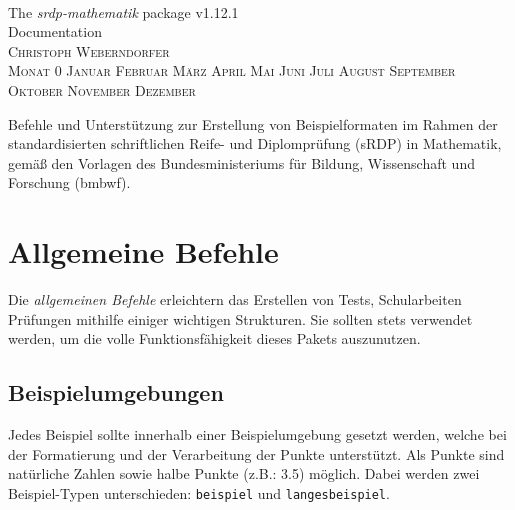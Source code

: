 \documentclass[a4paper,12pt]{article}
\makeatletter
\renewcommand*\tableofcontents{\@starttoc{toc}}
\newcommand{\Monat}{%
\ifcase\month
 Monat 0 \or Januar \or Februar \or März  \or April \or Mai \or Juni \or Juli%
 \or August \or September \or Oktober \or November \or Dezember
\fi}
\makeatother
\begin{document}
\begin{titlepage}
\thispagestyle{empty}
\begin{center}
~

\vfill

\Huge The \textit{srdp-mathematik} package v1.12.1\\[1cm]

Documentation \\ [1cm]

\flushright
\textsc{\large Christoph Weberndorfer} \\[-0.5cm]
\textsc{\large \Monat~\the\year} \\ 
\vspace{\baselineskip}

\vfill

\centering
\normalsize 
Befehle und Unterstützung zur Erstellung von Beispielformaten im Rahmen der standardisierten schriftlichen Reife- und Diplomprüfung (sRDP) in Mathematik, gemäß den Vorlagen des Bundesministeriums für Bildung, Wissenschaft und Forschung (bmbwf). 
\vfill 

\begingroup
\let\cleardoublepage\relax
\let\clearpage\relax
\normalsize \tableofcontents
\endgroup

\leer


\end{center}


\end{titlepage}


\section{Allgemeine Befehle}
Die \textit{allgemeinen Befehle} erleichtern das Erstellen von Tests, Schularbeiten Prüfungen mithilfe einiger wichtigen Strukturen. Sie sollten stets verwendet werden, um die volle Funktionsfähigkeit dieses Pakets auszunutzen. 
\vspace{1cm}

\subsection{Beispielumgebungen}

Jedes Beispiel sollte innerhalb einer Beispielumgebung gesetzt werden, welche bei der Formatierung und der Verarbeitung der Punkte unterstützt. Als Punkte sind natürliche Zahlen sowie halbe Punkte (z.B.: 3.5) möglich. Dabei werden zwei Beispiel-Typen unterschieden: \texttt{beispiel} und \texttt{langesbeispiel}.   
\end{document}
